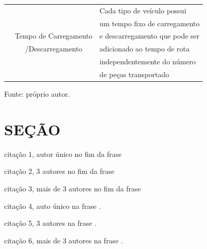\begin{quadro}[H]
\begin{tabular}{|c|c|l|}
                                            &                                               & Cada tipo de veículo possui  \\
                                            &                                               & um tempo fixo de carregamento         \\
                                            & Tempo de Carregamento                         & e descarregamento que pode ser        \\
                                            & /Descarregamento                              & adicionado ao tempo de rota           \\
                                            &                                               & independentemente do número           \\
                                            &                                               & de peças transportado                 \\ 
                \hline
            \end{tabular}
            \label{tab:restricoes}
            \par \footnotesize Fonte: próprio autor.
        \end{quadro}

\section{SEÇÃO}
    
    \noindent citação 1, autor único no fim da frase \cite{Markowitz1952} %

    \noindent citação 2, 3 autores no fim da frase \cite{Mansini2014} %

    \noindent citação 3, mais de 3 autores no fim da frase \cite{Vukovic2020} %

    \noindent citação 4, auto único na frase . %

    \noindent citação 5, 3 autores na frase . %

    \noindent citação 6, mais de 3 autores na frase . %